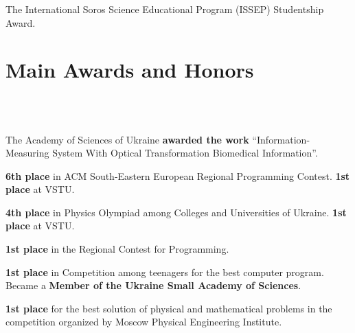 \documentclass[10pt,overlapped,line]{res}
\newcommand{\mplace}[1]{\textbf{#1}}
\begin{document}
\begin{resume}
 \employer{}
 \begin{position}
  The International Soros Science Educational Program (ISSEP) Studentship Award.
 \end{position}


 \section{Main Awards and Honors}
 \begin{format}
    \\
   \body\\
 \end{format}

 \begin{position}
   The Academy of Sciences of Ukraine \mplace{awarded the work}
   ``Information-Measuring System With Optical Transformation
   Biomedical Information''.
 \end{position}

 \begin{position}
   \mplace{6th place} in ACM South-Eastern European Regional
   Programming Contest. \mplace{1st place} at VSTU.
 \end{position}

 \begin{position}
   \mplace{4th place} in Physics Olympiad among Colleges and
   Universities of Ukraine. \mplace{1st place} at VSTU.
 \end{position}

 \begin{position}
 \mplace{1st place} in the Regional Contest for Programming.
 \end{position}

 \begin{position}
   \mplace{1st place} in Competition among teenagers for the best
   computer program. Became a \mplace{Member of the Ukraine Small Academy
     of Sciences}.
 \end{position}

 \begin{position}
   \mplace{1st place} for the best solution of physical and mathematical
   problems in the competition organized by Moscow Physical Engineering Institute.
 \end{position}


\end{resume}
\end{document}
